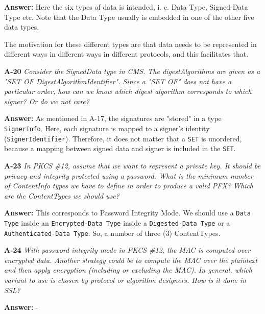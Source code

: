\documentclass[a4paper]{article}
\newcommand{\Q}[2]{ \vspace{10pt} \textbf{A-#1} \textit{#2} }
\newcommand{\A}[1]{ \textbf{Answer:} #1 }
\begin{document}
\A{
    Here the six types of data is intended, i. e. Data Type,
    Signed-Data Type etc. Note that the Data Type usually is
    embedded in one of the other five data types.

    The motivation for these different types are that data
    needs to be represented in different ways in different
    ways in different protocols, and this facilitates that.
}

\Q{20} {
    Consider the SignedData type in CMS. 
    The digestAlgorithms are given as a "SET OF DigestAlgorithmIdentifier".
    Since a "SET OF" does not have a particular order, how can we know 
    which digest algorithm corresponds to which signer? Or do we not care?
}

\A{
    As mentioned in A-17, the signatures are "stored" in a type 
    \texttt{SignerInfo}. Here, each signature is mapped to a signer's
    identity (\texttt{SignerIdentifier}).
    Therefore, it does not matter that a \texttt{SET} is unordered,
    because a mapping between signed data and signer is included in the
    \texttt{SET}.
}

\Q{23} {
    In PKCS \#12, assume that we want to represent a private key. 
    It should be privacy and integrity protected using a password. 
    What is the minimum number of ContentInfo types we have to define
    in order to produce a valid PFX? Which are the ContentTypes we should use?
}

\A{
    This corresponds to Password Integrity Mode. We should use 
    a \texttt{Data Type} inside an \texttt{Encrypted-Data Type} inside a 
    \texttt{Digested-Data Type} or a \texttt{Authenticated-Data Type}.
    So, a number of three (3) ContentTypes.
}

\Q{24} {
    With password integrity mode in PKCS \#12, the MAC is computed over 
    encrypted data. Another strategy could be to compute the MAC over 
    the plaintext and then apply encryption (including or excluding
    the MAC). In general, which variant to use is chosen by protocol or 
    algorithm designers. How is it done in SSL?
}

\A{
    -
}
\end{document}
